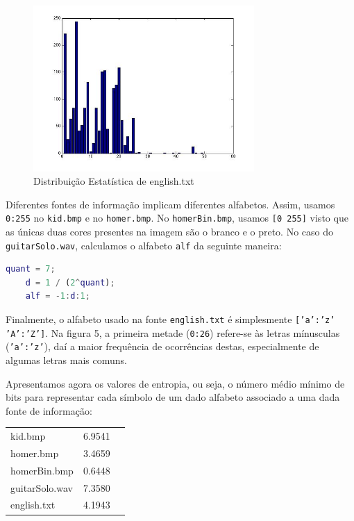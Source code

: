 \documentclass[12pt]{article}
\begin{document}
  \begin{figure}[H]
    \centering
      \includegraphics[width=0.75\textwidth]{ex3english}
    \caption{Distribuição Estatística de english.txt}
  \end{figure}

  Diferentes fontes de informação implicam diferentes alfabetos. Assim, usamos
  \texttt{0:255} no \texttt{kid.bmp} e no \texttt{homer.bmp}. No \texttt{homerBin.bmp},
  usamos \texttt{[0 255]} visto que as únicas duas cores presentes na imagem
  são o branco e o preto. No caso do \texttt{guitarSolo.wav}, calculamos o alfabeto
  \texttt{alf} da seguinte maneira:

  \vspace{2mm}
  \begin{lstlisting}[language=Matlab]
    quant = 7;
    d = 1 / (2^quant);
    alf = -1:d:1;
  \end{lstlisting}

  Finalmente, o alfabeto usado na fonte \texttt{english.txt} é simplesmente
  \texttt{['a':'z' 'A':'Z']}. Na figura 5, a primeira metade (\texttt{0:26})
  refere-se às letras mínusculas (\texttt{'a':'z'}), daí a maior frequência de ocorrências destas, especialmente de algumas letras mais comuns.

  Apresentamos agora os valores de entropia, ou seja, o número médio mínimo
  de bits para representar cada símbolo de um dado alfabeto associado a uma
  dada fonte de informação:

  \begin{tabular}{ l c r }
    kid.bmp & 6.9541 \\
    homer.bmp & 3.4659 \\
    homerBin.bmp & 0.6448 \\
    guitarSolo.wav & 7.3580 \\
    english.txt & 4.1943 \\
  \end{tabular}
\end{document}
